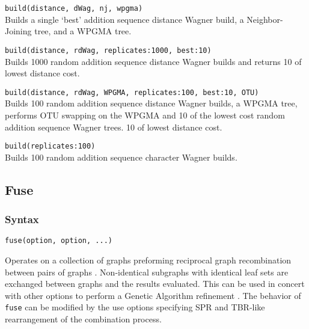 	\begin{example}
	
		\item{\texttt{build(distance, dWag, nj, wpgma)} \\ 
		Builds a single `best' addition sequence distance Wagner build, 
		a Neighbor-Joining tree, and a WPGMA tree.}
		
		\item{\texttt{build(distance, rdWag, replicates:1000, best:10)}\\
		Builds 1000 random addition sequence distance Wagner builds and returns 
		10 of lowest distance cost.}
	
		\item{\texttt{build(distance, rdWag, WPGMA, replicates:100, best:10, OTU)}\\
		Builds 100 random addition sequence distance Wagner builds, a WPGMA tree, 
		performs OTU swapping on the WPGMA and 10 of the lowest cost random addition 
		sequence Wagner trees. 
		10 of lowest distance cost.}
	
		\item{\texttt{build(replicates:100)} \\
		Builds 100 random addition sequence character Wagner builds.}

	\end{example}

\subsection{Fuse}
	\subsubsection{Syntax}
		\texttt{fuse(option, option, ...)}
		
	\begin{phygdescription}
		{Operates on a collection of graphs preforming reciprocal graph recombination between pairs of 
		graphs \citep{moilanen1999, moilanen2001, goloboff1999}. Non-identical subgraphs with identical 
		leaf sets are exchanged between graphs and the results evaluated. This can be used in concert 
		with other options to perform a Genetic Algorithm refinement \citep{Holland1975}. The behavior of 
		\texttt{fuse} can be modified by the use options specifying SPR and TBR-like rearrangement of the 
		combination process.}
	\end{phygdescription}
	
